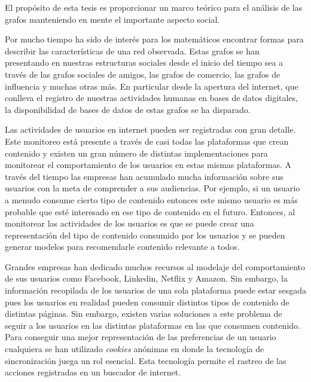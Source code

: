 El propósito de esta tesis es proporcionar un marco teórico para el análisis de las grafos manteniendo en mente el importante aspecto social.

Por mucho tiempo ha sido de interés para los matemáticos encontrar formas para describir las características de una red observada. Estas grafos se han presentando en nuestras estructuras sociales desde el inicio del tiempo sea a través de las grafos sociales de amigos, las grafos de comercio, las grafos de influencia y muchas otras más. En particular desde la apertura del internet, que conlleva el registro de nuestras actividades humanas en bases de datos digitales, la disponibilidad de bases de datos de estas grafos se ha disparado.

Las actividades de usuarios en internet pueden ser registradas con gran detalle. Este monitoreo está presente a través de casi todas las plataformas que crean contenido y existen un gran número de distintas implementaciones para monitorear el comportamiento de los usuarios en estas mismas plataformas. A través del tiempo las empresas han acumulado mucha información sobre sus usuarios con la meta de comprender a sus audiencias. Por ejemplo, si un usuario a menudo consume cierto tipo de contenido entonces este mismo usuario es más probable que esté interesado en ese tipo de contenido en el futuro. Entonces, al monitorear las actividades de los usuarios es que se puede crear una representación del tipo de contenido consumido por los usuarios y se pueden generar modelos para recomendarle contenido relevante a todos.


Grandes empresas han dedicado muchos recursos al modelaje del comportamiento de sus usuarios como Facebook, Linkedin, Netflix y Amazon. Sin embargo, la información recopilada de los usuarios de una sola plataforma puede estar sesgada pues los usuarios en realidad pueden consumir distintos tipos de contenido de distintas páginas. Sin embargo, existen varias soluciones a este problema de seguir a los usuarios en las distintas plataformas en las que consumen contenido. Para conseguir una mejor representación de las preferencias de un usuario cualquiera se han utilizado \textit{cookies} anónimas en donde la tecnología de sincronización juega un rol esencial. Esta tecnología permite el rastreo de las acciones registradas en un buscador de internet.

